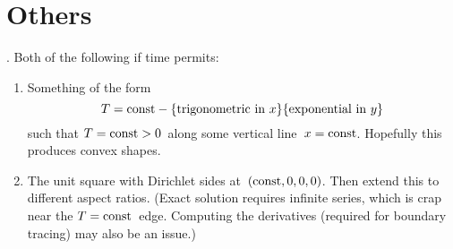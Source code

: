 \section{Others}

\tbd. Both of the following if time permits:
\begin{enumerate}
  \item
    Something of the form
    \[
      T = \const - \textq{trigonometric in~$x$} \textq{exponential in~$y$}
    \]
    such that $T = \mathrm{const} > 0$~along some vertical line~$x = \mathrm{const}$.
    Hopefully this produces convex shapes.
  \item
    The unit square with Dirichlet sides at~$(\mathrm{const}, 0, 0, 0)$.
    Then extend this to different aspect ratios.
    (Exact solution requires infinite series,
    which is crap near the $T = \mathrm{const}$~edge.
    Computing the derivatives (required for boundary tracing)
    may also be an issue.)
\end{enumerate}
